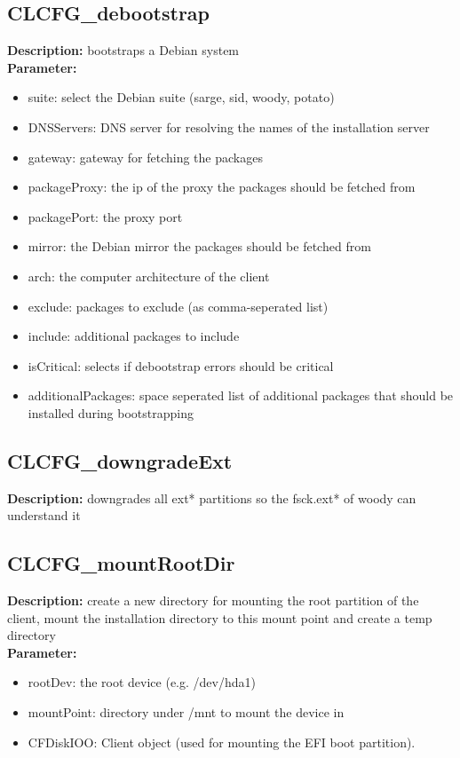 \subsection{CLCFG\_debootstrap}
\textbf{Description:} bootstraps a Debian system\\
\textbf{Parameter:}
\begin{itemize}
\item suite: select the Debian suite (sarge, sid, woody, potato)
\item DNSServers: DNS server for resolving the names of the installation server
\item gateway: gateway for fetching the packages
\item packageProxy: the ip of the proxy the packages should be fetched from
\item packagePort: the proxy port
\item mirror: the Debian mirror the packages should be fetched from
\item arch: the computer architecture of the client
\item exclude: packages to exclude (as comma-seperated list)
\item include: additional packages to include
\item isCritical: selects if debootstrap errors should be critical
\item additionalPackages: space seperated list of additional packages that should be installed during bootstrapping
\end{itemize}

\subsection{CLCFG\_downgradeExt}
\textbf{Description:} downgrades all ext* partitions so the fsck.ext* of woody can understand it\\

\subsection{CLCFG\_mountRootDir}
\textbf{Description:} create a new directory for mounting the root partition of the client, mount the installation directory to this mount point and create a temp directory\\
\textbf{Parameter:}
\begin{itemize}
\item rootDev: the root device (e.g. /dev/hda1)
\item mountPoint: directory under /mnt to mount the device in
\item CFDiskIOO: Client object (used for mounting the EFI boot partition).
\end{itemize}

